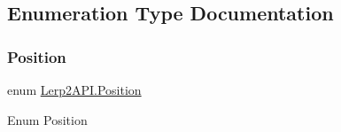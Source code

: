 \subsection{Enumeration Type Documentation}
\mbox{\label{namespace_lerp2_a_p_i_a5b0f263f740f1f4c8b67cf0c011dd90d}} 
\subsubsection{\texorpdfstring{Position}{Position}}
{\footnotesize\ttfamily enum \hyperlink{namespace_lerp2_a_p_i_a5b0f263f740f1f4c8b67cf0c011dd90d}{Lerp2\+A\+P\+I.\+Position}\hspace{0.3cm}{\ttfamily [strong]}}



Enum Position 

